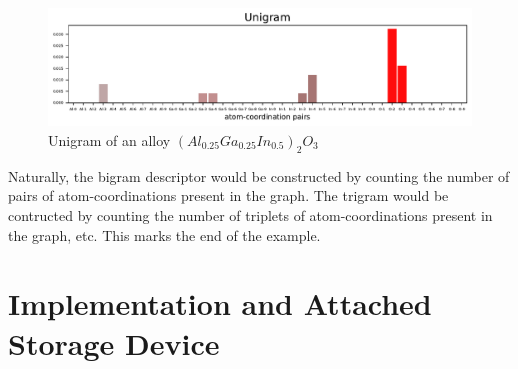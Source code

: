 \documentclass[11pt,oneside,czech,american]{book} %
\theoremstyle{plain}
\theoremstyle{definition}
\begin{document}
\begin{figure}[H]
	\centering
	\includegraphics[scale=.85]{unigram_id_20.pdf}
	\caption{Unigram of an alloy $(Al_{0.25}Ga_{0.25}In_{0.5})_2 O_3$}
	\label{unigram}
\end{figure}
Naturally, the bigram descriptor would be constructed by counting the number of pairs of atom-coordinations present in the graph. The trigram would be contructed by counting the number of triplets of atom-coordinations present in the graph, etc. This marks the end of the example.

\chapter{Implementation and Attached Storage Device}
\printbibliography
\end{document}
